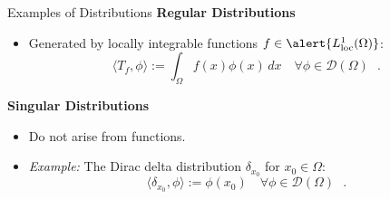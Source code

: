 \documentclass[aspectratio=169]{beamer}
\begin{document}
\begin{frame}{Examples of Distributions}
    \textbf{Regular Distributions}
    \begin{itemize}
        \item Generated by locally integrable functions $f \in \alert{L^1_{\text{loc}}(\Omega)}$:
        \[
            \langle T_f, \phi \rangle := \int_\Omega f(x)\phi(x) \, dx \quad \forall \phi \in \mathcal{D}(\Omega) \text{ }.
        \]
    \end{itemize}

    \vspace{0.3cm}
    \textbf{Singular Distributions}
    \begin{itemize}
        \item Do not arise from functions.
        \item \textit{Example:} The Dirac delta distribution $\delta_{x_0}$ for $x_0 \in \Omega$:
        \[
            \langle \delta_{x_0}, \phi \rangle := \phi(x_0) \quad \forall \phi \in \mathcal{D}(\Omega) \text{ }.
        \]
    \end{itemize}
\end{frame}
\end{document}
